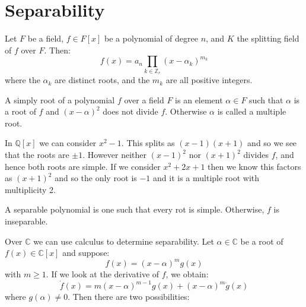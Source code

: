 \documentclass{article}                                                        %
\begin{document}
    \section{Separability}
            Let $F$ be a field, $f\in{F}[x]$ be a polynomial of degree $n$, and
            $K$ the splitting field of $f$ over $F$. Then:
            \begin{equation}
                f(x)=a_{n}\prod_{k\in\mathbb{Z}_{r}}(x-\alpha_{k})^{m_{k}}
            \end{equation}
            where the $\alpha_{k}$ are distinct roots, and the $m_{k}$ are all
            positive integers.
            \begin{definition}
                A simply root of a polynomial $f$ over a field $F$ is an element
                $\alpha\in{F}$ such that $\alpha$ is a root of $f$ and
                $(x-\alpha)^{2}$ does not divide $f$. Otherwise $\alpha$ is
                called a multiple root.
            \end{definition}
            \begin{example}
                In $\mathbb{Q}[x]$ we can consider $x^{2}-1$. This splits as
                $(x-1)(x+1)$ and so we see that the roots are $\pm{1}$. However
                neither $(x-1)^{2}$ nor $(x+1)^{2}$ divides $f$, and hence both
                roots are simple. If we consider $x^{2}+2x+1$ then we know this
                factors as $(x+1)^{2}$ and so the only root is $\minus{1}$ and
                it is a multiple root with multiplicity 2.
            \end{example}
            \begin{definition}
                A separable polynomial is one such that every rot is simple.
                Otherwise, $f$ is inseparable.
            \end{definition}
            Over $\mathbb{C}$ we can use calculus to determine separability.
            Let $\alpha\in\mathbb{C}$ be a root of $f(x)\in\mathbb{C}[x]$ and
            suppose:
            \begin{equation}
                f(x)=(x-\alpha)^{m}g(x)
            \end{equation}
            with $m\geq{1}$. If we look at the derivative of $f$, we obtain:
            \begin{equation}
                \dot{f}(x)=m(x-\alpha)^{m-1}g(x)+(x-\alpha)^{m}\dot{g}(x)
            \end{equation}
            where $g(\alpha)\ne{0}$. Then there are two possibilities:
\end{document}
